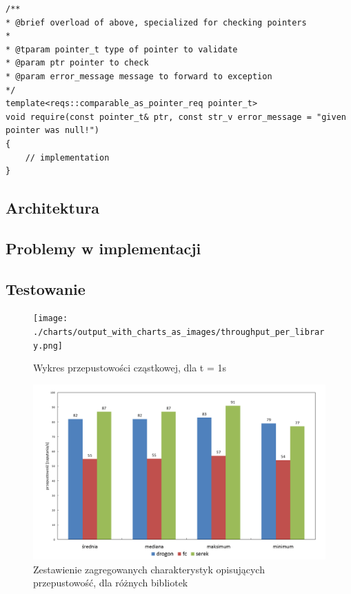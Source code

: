 \documentclass[12pt]{article}
\begin{document}
{{{\begin{lstlisting}[frame=single]
/**
* @brief overload of above, specialized for checking pointers
*
* @tparam pointer_t type of pointer to validate
* @param ptr pointer to check
* @param error_message message to forward to exception
*/
template<reqs::comparable_as_pointer_req pointer_t>
void require(const pointer_t& ptr, const str_v error_message = "given pointer was null!")
{
	// implementation
}
				\end{lstlisting}
			}
		}

		{
			\subsection{Architektura}
		}

		{
			\subsection{Problemy w implementacji}
		}

		{
			\subsection{Testowanie}
		}
	}

	\newpage

	{
		\begin{figure}[H]
			\centering
			\texttt{[image: ./charts/output\_with\_charts\_as\_images/throughput\_per\_library.png]}
			\caption{Wykres przepustowości cząstkowej, dla \Delta t  = 1s}
			\medskip
		\end{figure}
	}

	{
		\begin{figure}[H]
			\centering
			\includegraphics[width=15cm,keepaspectratio=true]{./charts/pre_generated_charts/throughput_summary_per_library_summary.png}
			\caption{Zestawienie zagregowanych charakterystyk opisujących przepustowość, dla różnych bibliotek}
			\medskip
		\end{figure}
	}
\end{document}
